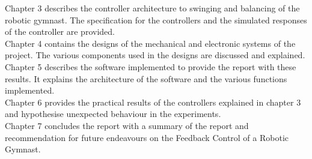 Chapter 3 describes the controller architecture to swinging and balancing of the robotic gymnast. The specification for the controllers and the simulated responses of the controller are provided.\\

Chapter 4 contains the designs of the mechanical and electronic systems of the project. The various components used in the designs are discussed and explained.\\

Chapter 5 describes the software implemented to provide the report with these results. It explains the architecture of the software and the various functions implemented.\\

Chapter 6 provides the practical results of the controllers explained in chapter 3 and hypothesise unexpected behaviour in the experiments.\\

Chapter 7 concludes the report with a summary of the report and recommendation for future endeavours on the Feedback Control of a Robotic Gymnast. 

 
